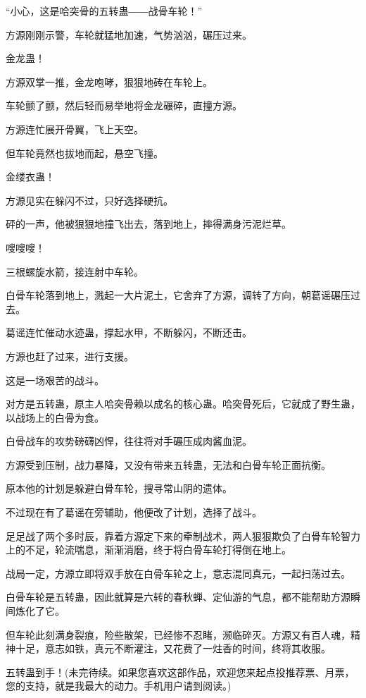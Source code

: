 \begin{this_body}
“小心，这是哈突骨的五转蛊――战骨车轮！”

方源刚刚示警，车轮就猛地加速，气势汹汹，碾压过来。

金龙蛊！

方源双掌一推，金龙咆哮，狠狠地砖在车轮上。

车轮颤了颤，然后轻而易举地将金龙碾碎，直撞方源。

方源连忙展开骨翼，飞上天空。

但车轮竟然也拔地而起，悬空飞撞。

金缕衣蛊！

方源见实在躲闪不过，只好选择硬抗。

砰的一声，他被狠狠地撞飞出去，落到地上，摔得满身污泥烂草。

嗖嗖嗖！

三根螺旋水箭，接连射中车轮。

白骨车轮落到地上，溅起一大片泥土，它舍弃了方源，调转了方向，朝葛谣碾压过去。

葛谣连忙催动水迹蛊，撑起水甲，不断躲闪，不断还击。

方源也赶了过来，进行支援。

这是一场艰苦的战斗。

对方是五转蛊，原主人哈突骨赖以成名的核心蛊。哈突骨死后，它就成了野生蛊，以战场上的白骨为食。

白骨战车的攻势磅礴凶悍，往往将对手碾压成肉酱血泥。

方源受到压制，战力暴降，又没有带来五转蛊，无法和白骨车轮正面抗衡。

原本他的计划是躲避白骨车轮，搜寻常山阴的遗体。

不过现在有了葛谣在旁辅助，他便改了计划，选择了战斗。

足足战了两个多时辰，靠着方源定下来的牵制战术，两人狠狠欺负了白骨车轮智力上的不足，轮流喘息，渐渐消磨，终于将白骨车轮打得倒在地上。

战局一定，方源立即将双手放在白骨车轮之上，意志混同真元，一起扫荡过去。

白骨车轮是五转蛊，因此就算是六转的春秋蝉、定仙游的气息，都不能帮助方源瞬间炼化了它。

但车轮此刻满身裂痕，险些散架，已经惨不忍睹，濒临碎灭。方源又有百人魂，精神十足，意志如铁，真元不断灌注，又花费了一炷香的时间，终将其收服。

五转蛊到手！(未完待续。如果您喜欢这部作品，欢迎您来起点投推荐票、月票，您的支持，就是我最大的动力。手机用户请到阅读。)

\end{this_body}

